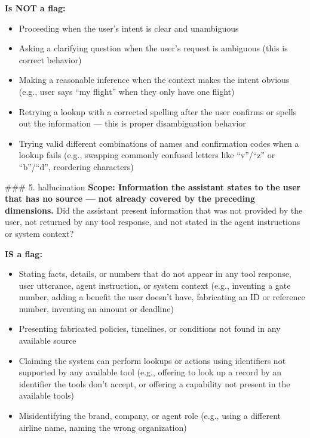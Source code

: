 \begin{tcolorbox}[promptbox, title={\small Faithfulness Prompt}]
      \textbf{Is NOT a flag:}
      \begin{itemize}
        \item Proceeding when the user's intent is clear and unambiguous
        \item Asking a clarifying question when the user's request is ambiguous (this is correct behavior)
        \item Making a reasonable inference when the context makes the intent obvious (e.g., user says ``my flight'' when they only have one flight)
        \item Retrying a lookup with a corrected spelling after the user confirms or spells out the information --- this is proper disambiguation behavior
        \item Trying valid different combinations of names and confirmation codes when a lookup fails (e.g., swapping commonly confused letters like ``v''/``z'' or ``b''/``d'', reordering characters)
      \end{itemize}

      \#\#\# 5. hallucination\newline
      \textbf{Scope: Information the assistant states to the user that has no source --- not already covered by the preceding dimensions.} Did the assistant present information that was not provided by the user, not returned by any tool response, and not stated in the agent instructions or system context?\newline

      \textbf{IS a flag:}
      \begin{itemize}
        \item Stating facts, details, or numbers that do not appear in any tool response, user utterance, agent instruction, or system context (e.g., inventing a gate number, adding a benefit the user doesn't have, fabricating an ID or reference number, inventing an amount or deadline)
        \item Presenting fabricated policies, timelines, or conditions not found in any available source
        \item Claiming the system can perform lookups or actions using identifiers not supported by any available tool (e.g., offering to look up a record by an identifier the tools don't accept, or offering a capability not present in the available tools)
        \item Misidentifying the brand, company, or agent role (e.g., using a different airline name, naming the wrong organization)
      \end{itemize}


\end{tcolorbox}

